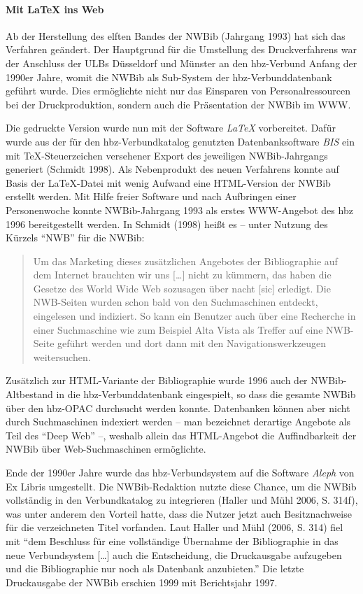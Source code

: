 \documentclass[a4paper,
fontsize=11pt,
oneside,
numbers=noperiodatend,
parskip=half-,
bibliography=totoc,
final
]{scrartcl}
\begin{document}
\paragraph{Mit LaTeX ins Web}\label{mit-latex-ins-web}

Ab der Herstellung des elften Bandes der NWBib (Jahrgang 1993) hat sich
das Verfahren geändert. Der Hauptgrund für die Umstellung des
Druckverfahrens war der Anschluss der ULBs Düsseldorf und Münster an den
hbz-Verbund Anfang der 1990er Jahre, womit die NWBib als Sub-System der
hbz-Verbunddatenbank geführt wurde. Dies ermöglichte nicht nur das
Einsparen von Personalressourcen bei der Druckproduktion, sondern auch
die Präsentation der NWBib im WWW.

Die gedruckte Version wurde nun mit der Software \emph{LaTeX}
vorbereitet. Dafür wurde aus der für den hbz-Verbundkatalog genutzten
Datenbanksoftware \emph{BIS} ein mit TeX-Steuerzeichen versehener Export
des jeweiligen NWBib-Jahrgangs generiert (Schmidt 1998). Als
Nebenprodukt des neuen Verfahrens konnte auf Basis der LaTeX-Datei mit
wenig Aufwand eine HTML-Version der NWBib erstellt werden. Mit Hilfe
freier Software und nach Aufbringen einer Personenwoche konnte
NWBib-Jahrgang 1993 als erstes WWW-Angebot des hbz 1996 bereitgestellt
werden. In Schmidt (1998) heißt es -- unter Nutzung des Kürzels
\enquote{NWB} für die NWBib:

\begin{quote}
Um das Marketing dieses zusätzlichen Angebotes der Bibliographie auf dem
Internet brauchten wir uns {[}\ldots{}{]} nicht zu kümmern, das haben
die Gesetze des World Wide Web sozusagen über nacht {[}sic{]} erledigt.
Die NWB-Seiten wurden schon bald von den Suchmaschinen entdeckt,
eingelesen und indiziert. So kann ein Benutzer auch über eine Recherche
in einer Suchmaschine wie zum Beispiel Alta Vista als Treffer auf eine
NWB-Seite geführt werden und dort dann mit den Navigationswerkzeugen
weitersuchen.
\end{quote}

Zusätzlich zur HTML-Variante der Bibliographie wurde 1996 auch der
NWBib-Altbestand in die hbz-Verbunddatenbank eingespielt, so dass die
gesamte NWBib über den hbz-OPAC durchsucht werden konnte. Datenbanken
können aber nicht durch Suchmaschinen indexiert werden -- man bezeichnet
derartige Angebote als Teil des \enquote{Deep Web} --, weshalb allein
das HTML-Angebot die Auffindbarkeit der NWBib über Web-Suchmaschinen
ermöglichte.

Ende der 1990er Jahre wurde das hbz-Verbundsystem auf die Software
\emph{Aleph} von Ex Libris umgestellt. Die NWBib-Redaktion nutzte diese
Chance, um die NWBib vollständig in den Verbundkatalog zu integrieren
(Haller und Mühl 2006, S. 314f), was unter anderem den Vorteil hatte,
dass die Nutzer jetzt auch Besitznachweise für die verzeichneten Titel
vorfanden. Laut Haller und Mühl (2006, S. 314) fiel mit \enquote{dem
Beschluss für eine vollständige Übernahme der Bibliographie in das neue
Verbundsystem {[}\ldots{}{]} auch die Entscheidung, die Druckausgabe
aufzugeben und die Bibliographie nur noch als Datenbank anzubieten.} Die
letzte Druckausgabe der NWBib erschien 1999 mit Berichtsjahr 1997.
\end{document}
